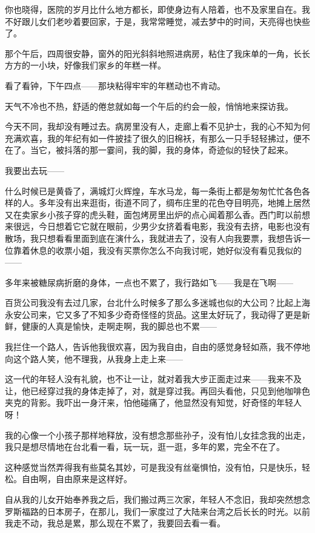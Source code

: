 \par 你也晓得，医院的岁月比什么地方都长，即使身边有人陪着，也不及家里自在。我不好跟儿女们老吵着要回家，于是，我常常睡觉，减去梦中的时间，天亮得也快些了。
\par 那个午后，四周很安静，窗外的阳光斜斜地照进病房，粘住了我床单的一角，长长方方的一小块，好像我们家乡的年糕一样。
\par 看了看钟，下午四点——那块粘得牢牢的年糕动也不肯动。
\par 天气不冷也不热，舒适的倦怠就如每一个午后的约会一般，悄悄地来探访我。
\par 今天不同，我却没有睡过去。病房里没有人，走廊上看不见护士，我的心不知为何充满欢喜，我的年纪有如一件披挂了很久的旧棉袄，有那么一只手轻轻拂过，便不在了。当它，被抖落的那一霎间，我的脚，我的身体，奇迹似的轻快了起来。
\par 我要出去玩——
\par 什么时候已是黄昏了，满城灯火辉煌，车水马龙，每一条街上都是匆匆忙忙各色各样的人。多年没有出来逛街，街道不同了，绸布庄里的花色夺目明亮，地摊上居然又在卖家乡小孩子穿的虎头鞋，面包烤房里出炉的点心闻着那么香。西门町以前想来很远，今日想着它它就在眼前，少男少女挤着看电影，我没有去挤，电影也没有散场，我只想看看里面到底在演什么，我就进去了，没有人向我要票，我想告诉一位靠着休息的收票小姐，我没有买票你怎么不向我讨呢，她好似没有看见我似的——
\par 多年来被糖尿病折磨的身体，一点也不累了，我行路如飞——我是在飞啊——
\par 百货公司我没有去过几家，台北什么时候多了那么多迷城也似的大公司？比起上海永安公司来，它又多了不知多少奇奇怪怪的货品。这里太好玩了，我动得了更是新鲜，健康的人真是愉快，走啊走啊，我的脚总也不累——
\par 我拦住一个路人，告诉他我很欢喜，因为我自由，自由的感觉身轻如燕，我不停地向这个路人笑，他不理我，从我身上走上来——
\par 这一代的年轻人没有礼貌，也不让一让，就对着我大步正面走过来——我来不及让，他已经穿过我的身体走掉了，对，就是穿过我。再回头看他，只见到他咖啡色夹克的背影。我吓出一身汗来，怕他碰痛了，他显然没有知觉，好奇怪的年轻人呀！
\par 我的心像一个小孩子那样地释放，没有想念那些孙子，没有怕儿女挂念我的出走，我只是想尽情地在台北看一看，玩一玩，逛一逛，多年的累，完全不在了。
\par 这种感觉当然弄得我有些莫名其妙，可是我没有丝毫惧怕，没有怕，只是快乐，轻松。自由啊，自由原来是这样好。
\par 自从我的儿女开始奉养我之后，我们搬过两三次家，年轻人不念旧，我却突然想念罗斯福路的日本房子，在那儿，我们一家度过了大陆来台湾之后长长的时光。以前我走不动，我总是累，那么现在不累了，我要回去看一看。
